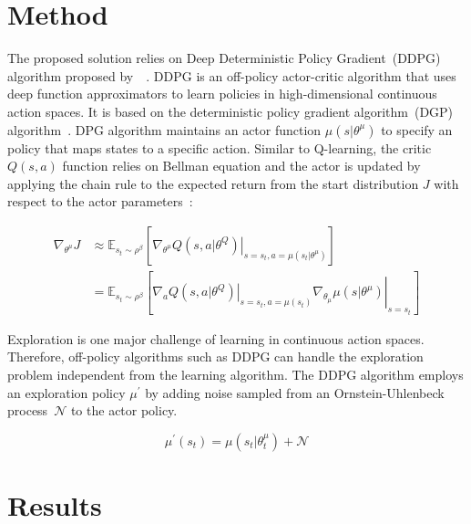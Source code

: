 \documentclass[12pt,english]{article}
\begin{document}
\section{Method}

The proposed solution relies on Deep Deterministic Policy Gradient~(DDPG) algorithm proposed by~\citeauthor{lillicrap:16}~\cite{lillicrap:16}. DDPG is an off-policy actor-critic algorithm that uses deep function approximators to learn policies in high-dimensional continuous action spaces. It is based on the deterministic policy gradient algorithm~(DGP) algorithm~\citeauthor{silver:14}. DPG algorithm maintains an actor function \(\mu(s|\theta^\mu)\) to specify an policy that maps states to a specific action. Similar to Q-learning, the critic \(Q(s,a)\) function relies on Bellman equation and the actor is updated by applying the chain rule to the expected return from the start distribution \(J\) with respect to the actor parameters~\cite{lillicrap:16}:

\begin{equation*}
   \begin{aligned}
      \nabla_{\theta^{\mu}} J & \approx \mathbb{E}_{s_{t} \sim \rho^{\beta}}\left[\left.\nabla_{\theta^{\mu}} Q\left(s, a | \theta^{Q}\right)\right|_{s=s_{t}, a=\mu\left(s_{t} | \theta^{\mu}\right)}\right] \\&=\mathbb{E}_{s_{t} \sim \rho^{\beta}}\left[\left.\left.\nabla_{a} Q\left(s, a | \theta^{Q}\right)\right|_{s=s_{t}, a=\mu\left(s_{t}\right)} \nabla_{\theta_{\mu}} \mu\left(s | \theta^{\mu}\right)\right|_{s=s_{t}}\right]
   \end{aligned}
\end{equation*}

Exploration is one major challenge of learning in continuous action spaces. Therefore, off-policy algorithms such as DDPG can handle the exploration problem independent from the learning algorithm. The DDPG algorithm employs an exploration policy \(\mu^\prime\) by adding noise sampled from an Ornstein-Uhlenbeck process~\(\mathcal{N}\) to the actor policy. 

\begin{equation*}
\mu^{\prime}\left(s_{t}\right)=\mu\left(s_{t} | \theta_{t}^{\mu}\right)+\mathcal{N}
\end{equation*}

\section{Results}
\end{document}
